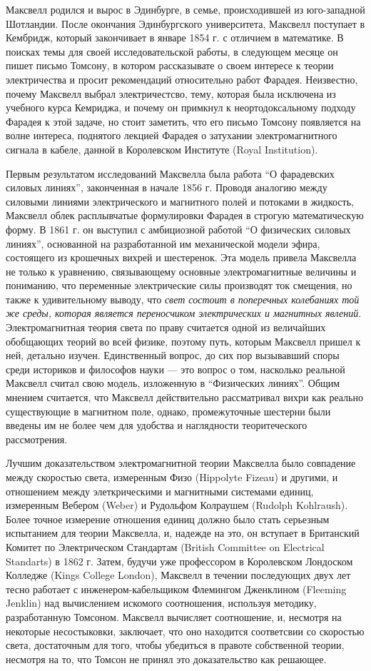 \documentclass[12pt, oneside, a4paper]{article}
\begin{document}
Максвелл родился и вырос в Эдинбурге, в семье, происходившей из юго-западной Шотландии. После окончания Эдинбургского университета, Максвелл поступает в Кембридж, который закончивает в январе 1854 г. с отличием в математике. В поисках темы для своей исследовательской работы, в следующем месяце он пишет письмо Томсону, в котором рассказывате о своем интересе к теории электричества и просит рекомендаций относительно работ Фарадея. Неизвестно, почему Максвелл выбрал электричестсво, тему, которая была исключена из учебного курса Кемриджа, и почему он примкнул к неортодоксальному подходу Фарадея к этой задаче, но стоит заметить, что  его письмо Томсону появляется на волне интереса, поднятого лекцией Фарадея о затухании электромагнитного сигнала в кабеле, данной в Королевском Институте (Royal Institution). 

Первым результатом исследований Максвелла была работа ``О фарадевских силовых линиях'', законченная в начале 1856 г. Проводя аналогию между силовыми линиями электрического и магнитного полей и потоками в жидкость, Максвелл облек расплывчатые формулировки Фарадея в строгую математическую форму. В 1861 г. он выступил с амбициозной работой ``О физических силовых линиях'', основанной на разработанной им механической модели эфира, состоящего из крошечных вихрей и шестеренок. Эта модель привела Максвелла не только к уравнению, связывающему основные электромагнитные величины и пониманию, что переменные электрические силы производят ток смещения, но также к удивительному выводу, что \emph{свет состоит в поперечных колебаниях той же среды, которая является переносчиком электрических и магнитных явлений}. 
Электромагнитная теория света по праву считается одной из величайших обобщающих теорий во всей физике, поэтому путь, которым Максвелл пришел к ней, детально изучен. Единственный вопрос, до сих пор вызывавший споры среди историков и философов науки --- это вопрос о том, насколько реальной Максвелл считал свою модель, изложенную в ``Физических линиях''. Общим мнением считается, что Максвелл действительно рассматривал вихри как реально существующие в магнитном поле, однако, промежуточные шестерни были введены им не более чем для удобства и наглядности теоритеческого рассмотрения. 

Лучшим доказательством электромагнитной теории Максвелла было совпадение между скоростью света, измеренным Физо (Hippolyte Fizeau) и другими, и отношением между элеткрическими и магнитными системами единиц, измеренным Вебером (Weber) и Рудольфом Колраушем (Rudolph Kohlraush). Более точное измерение отношения единиц должно было стать серьезным испытанием для теории Максвелла, и, надежде на это, он вступает в Британский Комитет по Электрическом Стандартам (British Committee on Electrical Standarts) в 1862 г. Затем, будучи уже профессором в Королевском Лондоском Колледже (Kings College London), Максвелл в течении последующих двух лет тесно работает с инженером-кабельщиком Флемингом Дженклином (Fleeming Jenklin) над вычислением искомого соотношения, используя методику, разработанную Томсоном. Максвелл вычисляет соотношение, и, несмотря на некоторые несостыковки, заключает, что оно находится соответсвии со скоростью света, достаточным для того, чтобы убедиться в правоте собственной теории, несмотря на то, что Томсон не принял это доказательство как решающее. 
\end{document}
